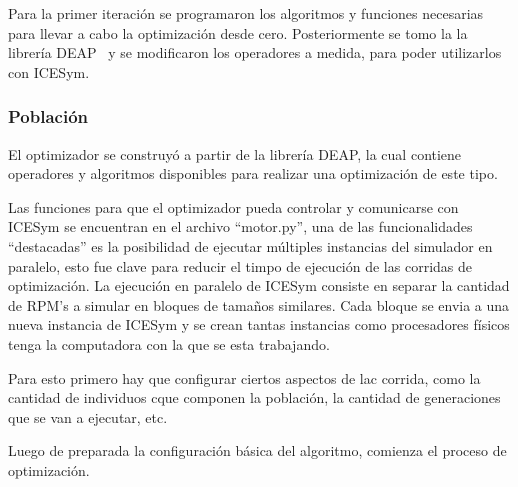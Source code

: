 Para la primer iteración se programaron los algoritmos y funciones necesarias
para llevar a cabo la optimización desde cero.
%
Posteriormente se tomo la la librería DEAP~\cite{DEAP_JMLR2012} y se
modificaron los operadores a medida, para poder utilizarlos con ICESym.

\subsubsection{Población}



































El optimizador se construyó a partir de la librería DEAP\cite{DEAP_JMLR2012}, la
cual contiene operadores y algoritmos disponibles para realizar una optimización
de este tipo.

Las funciones para que el optimizador pueda controlar y comunicarse con ICESym
se encuentran en el archivo ``motor.py'', una de las funcionalidades ``destacadas''
es la posibilidad de ejecutar múltiples instancias del simulador en paralelo, esto
fue clave para reducir el timpo de ejecución de las corridas de optimización.
%
La ejecución en paralelo de ICESym consiste en separar la cantidad de RPM's a simular
en bloques de tamaños similares.
%
Cada bloque se envia a una nueva instancia de ICESym y se crean tantas instancias
como procesadores físicos tenga la computadora con la que se esta trabajando.




Para esto primero hay que configurar ciertos aspectos de lac corrida, como la
cantidad de individuos cque componen la población, la cantidad de generaciones
que se van a ejecutar, etc.

Luego de preparada la configuración básica del algoritmo, comienza el proceso
de optimización.

